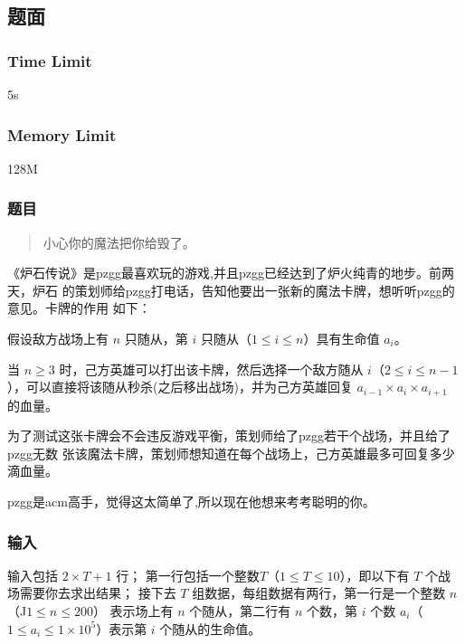 \subsection{题面}

\subsubsection{Time Limit}
5s

\subsubsection{Memory Limit}
128M

\subsubsection{题目}
\begin{quote}
小心你的魔法把你给毁了。
\end{quote}

《炉石传说》是pzgg最喜欢玩的游戏,并且pzgg已经达到了炉火纯青的地步。前两天，炉石
的策划师给pzgg打电话，告知他要出一张新的魔法卡牌，想听听pzgg的意见。卡牌的作用
如下：

假设敌方战场上有 $n$ 只随从，第 $i$ 只随从（$1 \leq i \leq n$）具有生命值 $a_i$。

当 $n \geq 3$ 时，己方英雄可以打出该卡牌，然后选择一个敌方随从 $i$（$2 \leq i
\leq n-1$），可以直接将该随从秒杀(之后移出战场)，并为己方英雄回复 $a_{i−1} \times
a_i \times a_{i+1}$ 的血量。

为了测试这张卡牌会不会违反游戏平衡，策划师给了pzgg若干个战场，并且给了pzgg无数
张该魔法卡牌，策划师想知道在每个战场上，己方英雄最多可回复多少滴血量。

pzgg是acm高手，觉得这太简单了,所以现在他想来考考聪明的你。

\subsubsection{输入}
输入包括 $2 \times T+1$ 行；
第一行包括一个整数$T$（$1 \leq T \leq 10$），即以下有 $T$ 个战场需要你去求出结果；
接下去 $T$ 组数据，每组数据有两行，第一行是一个整数 $n$ （J$1 \leq n \leq 200$）
表示场上有 $n$ 个随从，第二行有 $n$ 个数，第 $i$ 个数 $a_i$（$1 \leq a_i \leq 1
\times 10^5$）表示第 $i$ 个随从的生命值。

